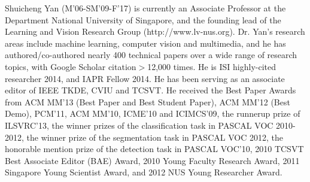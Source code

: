 \documentclass[journal]{IEEEtran}
\begin{document}
\begin{IEEEbiography}{Shuicheng Yan}
	(M'06-SM'09-F'17) is currently an Associate Professor at the Department National University of Singapore, and the founding lead of the Learning and Vision Research Group (http://www.lv-nus.org). Dr. Yan's research areas include machine learning, computer vision and multimedia, and he has authored/co-authored nearly 400 technical papers over a wide range of research topics, with Google Scholar citation$>$12,000 times. He is ISI highly-cited researcher 2014, and IAPR Fellow 2014. He has been serving as an associate editor of IEEE TKDE, CVIU and TCSVT. He received the Best Paper Awards from ACM MM'13 (Best Paper and Best Student Paper), ACM MM'12 (Best Demo), PCM'11, ACM MM'10, ICME'10 and ICIMCS'09, the runnerup prize of ILSVRC'13, the winner prizes of the classification task in PASCAL VOC 2010-2012, the winner prize of the segmentation task in PASCAL VOC 2012, the honorable mention prize of the detection task in PASCAL VOC'10, 2010 TCSVT Best Associate Editor (BAE) Award, 2010 Young Faculty Research Award, 2011 Singapore Young Scientist Award, and 2012 NUS Young Researcher Award.
\end{IEEEbiography}
\end{document}
